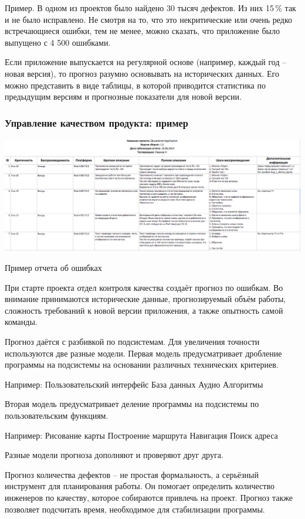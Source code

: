 \documentclass{../industrial-development}
\begin{document}
Пример. В одном из проектов было найдено 30 тысяч дефектов. Из них 15\,\% так и не было исправлено. Не смотря на то, что это некритические или очень редко встречающиеся ошибки, тем не менее, можно сказать, что приложение было выпущено с 4 500 ошибками.

Если приложение выпускается на регулярной основе (например, каждый год – новая версия), то прогноз разумно основывать на исторических данных. Его можно представить в виде таблицы, в которой приводится статистика по предыдущим версиям и прогнозные показатели для новой версии.

\begin{frame} \frametitle{Управление качеством продукта: пример}
	\centerline{\includegraphics[width=1\textwidth]{testing.png}}
	\centerline{Пример отчета об ошибках}
\end{frame}
\lecturenotes

При старте проекта отдел контроля качества создаёт прогноз по ошибкам. Во внимание принимаются исторические данные, прогнозируемый объём работы, сложность требований к новой версии приложения, а также опытность самой команды.

Прогноз даётся с разбивкой по подсистемам. Для увеличения точности используются две разные модели. Первая модель предусматривает дробление программы на подсистемы на основании различных технических критериев.

Например:
Пользовательский интерфейс
База данных
Аудио
Алгоритмы

Вторая модель предусматривает деление программы на подсистемы по пользовательским функциям.

Например:
Рисование карты
Построение маршрута
Навигация
Поиск адреса

Разные модели прогноза дополняют и проверяют друг друга.

Прогноз количества дефектов – не простая формальность, а серьёзный инструмент для планирования работы. Он помогает определить количество инженеров по качеству, которое собираются привлечь на проект. Прогноз также позволяет подсчитать время, необходимое для стабилизации программы.
\end{document}
